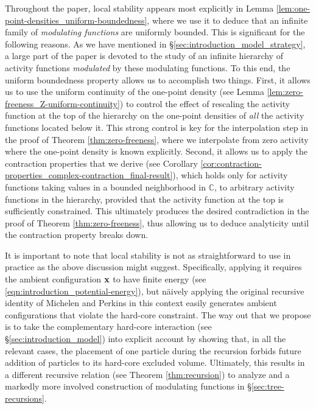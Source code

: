 \documentclass[11pt]{article}
\newcommand{\C}{\mathbb C}
\numberwithin{equation}{section}
\theoremstyle{plain}
\theoremstyle{definition}
\theoremstyle{remark}
\begin{document}
Throughout the paper, local stability appears most explicitly in Lemma \ref{lem:one-point-densities_uniform-boundedness}, where we use it to deduce that an infinite family of \emph{modulating functions} are uniformly bounded.
This is significant for the following reasons.
As we have mentioned in \S\ref{sec:introduction_model_strategy}, a large part of the paper is devoted to the study of an infinite hierarchy of activity functions \emph{modulated} by these modulating functions.
To this end, the uniform boundedness property allows us to accomplish two things.
First, it allows us to use the uniform continuity of the one-point density (see Lemma \ref{lem:zero-freeness_Z-uniform-continuity}) to control the effect of rescaling the activity function at the top of the hierarchy on the one-point densities of \emph{all} the activity functions located below it.
This strong control is key for the interpolation step in the proof of Theorem \ref{thm:zero-freeness}, where we interpolate from zero activity where the one-point density is known explicitly.
Second, it allows us to apply the contraction properties that we derive (see Corollary \ref{cor:contraction-properties_complex-contraction_final-result}), which holds only for activity functions taking values in a bounded neighborhood in $\C$, to arbitrary activity functions in the hierarchy, provided that the activity function at the top is sufficiently constrained.
This ultimately produces the desired contradiction in the proof of Theorem \ref{thm:zero-freeness}, thus allowing us to deduce analyticity until the contraction property breaks down.

It is important to note that local stability is not as straightforward to use in practice as the above discussion might suggest.
Specifically, applying it requires the ambient configuration $\vb{x}$ to have finite energy (see \eqref{eqn:introduction_potential-energy}), but n\"aively applying the original recursive identity of Michelen and Perkins in this context easily generates ambient configurations that violate the hard-core constraint.
The way out that we propose is to take the complementary hard-core interaction (see \S\ref{sec:introduction_model}) into explicit account by showing that, in all the relevant cases, the placement of one particle during the recursion forbids future addition of particles to its hard-core excluded volume.
Ultimately, this results in a different recursive relation (see Theorem \ref{thm:recursion}) to analyze and a markedly more involved construction of modulating functions in \S\ref{sec:tree-recursions}.
\end{document}
